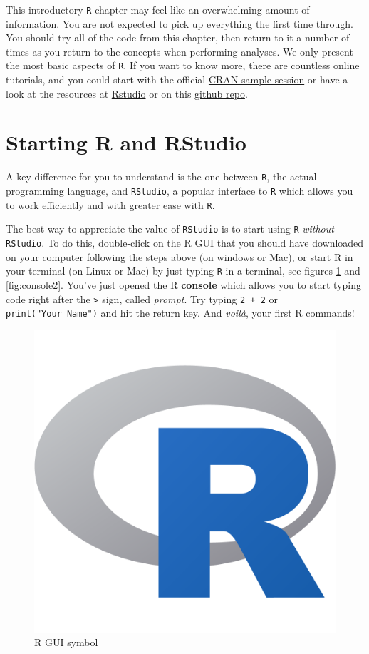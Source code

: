 \documentclass[]{book}
\begin{document}
This introductory \texttt{R} chapter may feel like an overwhelming amount of information. You are not expected to pick up everything the first time through. You should try all of the code from this chapter, then return to it a number of times as you return to the concepts when performing analyses. We only present the most basic aspects of \texttt{R}. If you want to know more, there are countless online tutorials, and you could start with the official \href{https://cran.r-project.org/doc/manuals/r-release/R-intro.html\#A-sample-session}{CRAN sample session} or have a look at the resources at \href{https://www.rstudio.com/online-learning/\#DataScience}{Rstudio} or on this \href{https://github.com/qinwf/awesome-R}{github repo}.

\hypertarget{starting-r-and-rstudio}{%
\section{Starting R and RStudio}\label{starting-r-and-rstudio}}

A key difference for you to understand is the one between \texttt{R}, the actual programming language, and \texttt{RStudio}, a popular interface to \texttt{R} which allows you to work efficiently and with greater ease with \texttt{R}.

The best way to appreciate the value of \texttt{RStudio} is to start using \texttt{R} \emph{without} \texttt{RStudio}. To do this, double-click on the R GUI that you should have downloaded on your computer following the steps above (on windows or Mac), or start R in your terminal (on Linux or Mac) by just typing \texttt{R} in a terminal, see figures \ref{fig:console1} and \ref{fig:console2}. You've just opened the R \textbf{console} which allows you to start typing code right after the \texttt{\textgreater{}} sign, called \emph{prompt}. Try typing \texttt{2\ +\ 2} or \texttt{print("Your\ Name")} and hit the return key. And \emph{voilà}, your first R commands!

\begin{figure}

{\centering \includegraphics[width=0.5\linewidth]{images/RLogo} 

}

\caption{R GUI symbol}\label{fig:console1}
\end{figure}
\end{document}
